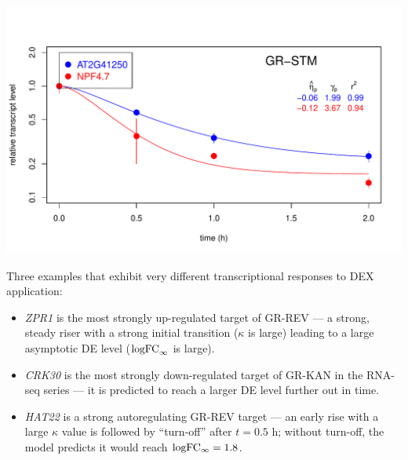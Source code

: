 \documentclass[aspb,landscape]{a0poster}
\newlength{\figwidth}
\newlength{\figtopspace}
\begin{document}
\begin{multicols}{3}
\begin{center}\vspace{\figtopspace}
    \includegraphics[width=\figwidth]{At2g41250-NPF47}
  \end{center}
  





  

  Three examples that exhibit very different transcriptional responses to DEX application:
  \begin{itemize}
  \item \textit{ZPR1} is the most strongly up-regulated target of GR-REV --- a strong, steady riser with a strong initial transition ($\kappa$ is large) leading to a large asymptotic DE level (${\rm logFC}_\infty$ is large).
  \item \textit{CRK30} is the most strongly down-regulated target of GR-KAN in the RNA-seq series --- it is predicted to reach a larger DE level further out in time.
  \item \textit{HAT22} is a strong autoregulating GR-REV target --- an early rise with a large $\kappa$ value is followed by ``turn-off'' after $t=0.5$ h; without turn-off, the model predicts it would reach $\rm logFC_\infty=1.8$.
  \end{itemize}


\end{multicols}
\end{document}
